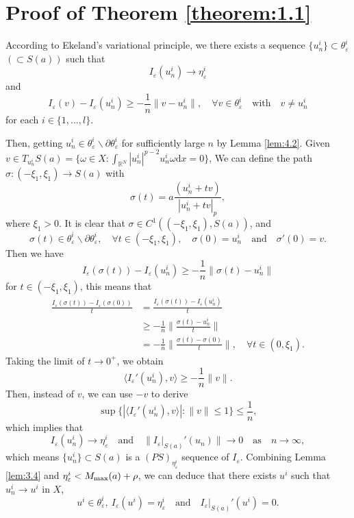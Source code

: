 \documentclass[reqno]{amsart}
\begin{document}
\section{Proof of Theorem \ref{theorem:1.1}}

According to Ekeland's variational principle, we  there exists a sequence 
$\{u_n^{i}\}\subset \theta_\varepsilon^{i}$ $(\subset S(a))$ such that
$$
I_{\varepsilon}(u_n^{i})\to\eta_\varepsilon^{i}
$$
and
$$
I_\varepsilon(v)-I_{\varepsilon}(u_n^{i})\ge-\frac{1}{n}\|v-u_n^{i}\|,\quad
\forall v\in\theta_\varepsilon^{i}\quad \text{with} \quad v\neq u_n^{i}
$$
for each $i\in\{1,\dots,l\}$.

Then, getting $u_n^{i}\in\theta_\varepsilon^{i}\backslash\partial\theta_\varepsilon^{i}$
 for sufficiently large $n$ by Lemma \ref{lem:4.2}.
Given $v\in T_{u_n^{i}}S(a)=\{\omega\in X:\int_{\mathbb{R}^N}
|u_n^{i}|^{p-2}u_n^{i}\omega \mathrm{d}x=0\}$,
We can define the path $\sigma:(-\xi_1,\xi_1)\to S(a)$
with
$$
\sigma(t)=a\frac{(u_n^{i}+tv)}{|u_n^{i}+tv|_p},
$$
where $\xi_1>0$. It is clear that $\sigma\in C^{1}((-\xi_1,\xi_1),S(a))$,
and
$$
\sigma(t)\in\theta_\varepsilon^{i}\backslash\partial\theta_\varepsilon^{i},\quad 
\forall t\in(-\xi_1,\xi_1),\quad \sigma(0)=u_n^{i}\quad \text{and} \quad \sigma'(0)=v.
$$
Then we have
$$
I_\varepsilon(\sigma(t))-I_\varepsilon(u_n^{i})\ge-\frac{1}{n}\|\sigma(t)-u_n^{i}\|
$$
for $t\in(-\xi_1,\xi_1)$, this means that
\begin{align*}
\frac{I_\varepsilon(\sigma(t))-I_\varepsilon(\sigma(0))}{t}
&=\frac{I_\varepsilon(\sigma(t))-I_\varepsilon(u_n^{i})}{t}\\
&\ge-\frac{1}{n}\|\frac{\sigma(t)-u_n^{i}}{t}\|\\
&=-\frac{1}{n}\|\frac{\sigma(t)-\sigma(0)}{t}\|,\quad\forall t\in(0,\xi_1).
\end{align*}
Taking the limit of $t\to0^{+}$, we obtain
$$
\langle I_{\varepsilon}' (u_n^{i}),v \rangle\ge-\frac{1}{n}\|v\|.
$$
Then, instead of $v$, we can use $-v$ to derive
$$
\sup\{|\langle I_{\varepsilon}' (u_n^{i}),v \rangle|:\|v\|\le1\}\le\frac{1}{n},
$$
which implies that
$$
I_{\varepsilon}(u_n^{i})\to\eta_\varepsilon^{i}\quad \text{and}\quad
\|I_\varepsilon|_{S(a)}'(u_n)\|\to 0\quad \text{as} \quad n\to\infty, 
$$
which means $\{u_n^{i}\}\subset S(a)$ is a $(PS)_{\eta_\varepsilon^{i}}$
sequence of $I_\varepsilon$.
Combining Lemma \ref{lem:3.4} and $\eta_\varepsilon^{i}<M_{\rm max}(a)+\rho$, we can 
deduce that there exists $u^{i}$ such that $u_n^{i}\to u^{i}$ in $X$,
$$
u^{i}\in\theta_\varepsilon^{i},~ I_\varepsilon(u^{i})=\eta_\varepsilon^{i}\quad 
\text{and}\quad I_\varepsilon|_{S(a)}'(u^{i})=0.
$$
\end{document}
